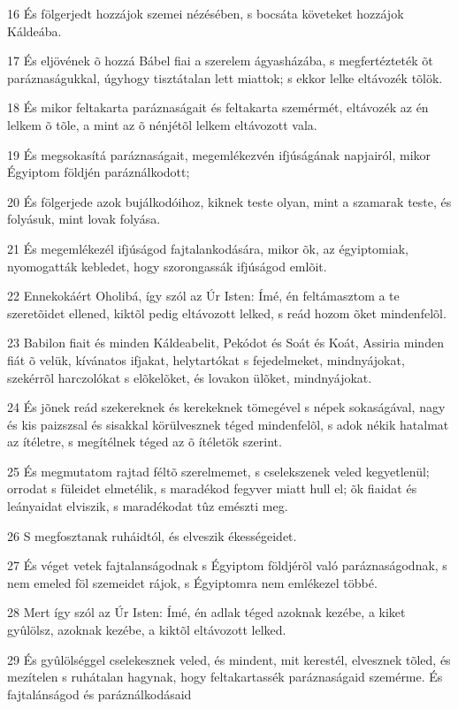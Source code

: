 \par 16 És fölgerjedt hozzájok szemei nézésében, s bocsáta követeket hozzájok Káldeába.
\par 17 És eljövének õ hozzá Bábel fiai a szerelem ágyasházába, s megfertézteték õt paráznaságukkal, úgyhogy tisztátalan lett miattok; s ekkor lelke eltávozék tõlök.
\par 18 És mikor feltakarta paráznaságait és feltakarta szemérmét, eltávozék az én lelkem õ tõle, a mint az õ nénjétõl lelkem eltávozott vala.
\par 19 És megsokasítá paráznaságait, megemlékezvén ifjúságának napjairól, mikor Égyiptom földjén paráználkodott;
\par 20 És fölgerjede azok bujálkodóihoz, kiknek teste olyan, mint a szamarak teste, és folyásuk, mint lovak folyása.
\par 21 És megemlékezél ifjúságod fajtalankodására, mikor õk, az égyiptomiak, nyomogatták kebledet, hogy szorongassák ifjúságod emlõit.
\par 22 Ennekokáért Oholibá, így szól az Úr Isten: Ímé, én feltámasztom a te szeretõidet ellened, kiktõl pedig eltávozott lelked, s reád hozom õket mindenfelõl.
\par 23 Babilon fiait és minden Káldeabelit, Pekódot és Soát és Koát, Assiria minden fiát õ velük, kívánatos ifjakat, helytartókat s fejedelmeket, mindnyájokat, szekérrõl harczolókat s elõkelõket, és lovakon ülõket, mindnyájokat.
\par 24 És jõnek reád szekereknek és kerekeknek tömegével s népek sokaságával, nagy és kis paizszsal és sisakkal körülvesznek téged mindenfelõl, s adok nékik hatalmat az ítéletre, s megítélnek téged az õ ítéletök szerint.
\par 25 És megmutatom rajtad féltõ szerelmemet, s cselekszenek veled kegyetlenül; orrodat s füleidet elmetélik, s maradékod fegyver miatt hull el; õk fiaidat és leányaidat elviszik, s maradékodat tûz emészti meg.
\par 26 S megfosztanak ruháidtól, és elveszik ékességeidet.
\par 27 És véget vetek fajtalanságodnak s Égyiptom földjérõl való paráznaságodnak, s nem emeled föl szemeidet rájok, s Égyiptomra nem emlékezel többé.
\par 28 Mert így szól az Úr Isten: Ímé, én adlak téged azoknak kezébe, a kiket gyûlölsz, azoknak kezébe, a kiktõl eltávozott lelked.
\par 29 És gyûlölséggel cselekesznek veled, és mindent, mit kerestél, elvesznek tõled, és mezítelen s ruhátalan hagynak, hogy feltakartassék paráznaságaid szemérme. És fajtalánságod és paráználkodásaid
